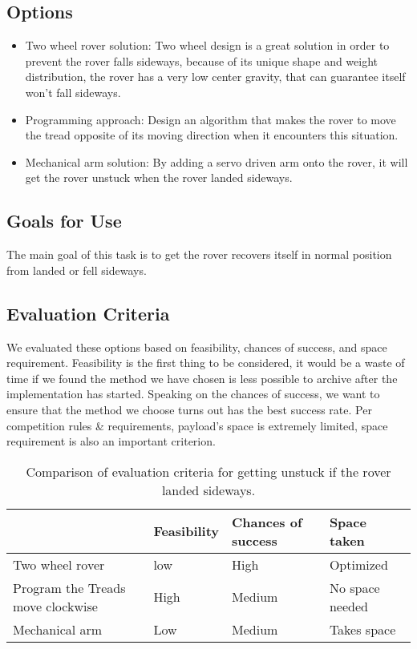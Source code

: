 \documentclass[10pt,letterpaper,onecolumn,journal]{IEEEtran}
\begin{document}
\subsection{Options}
\begin{itemize}
	\item Two wheel rover solution: Two wheel design is a great solution in order to prevent the rover falls sideways, because of its unique shape and weight distribution, the rover has a very low center gravity, that can guarantee itself won't fall sideways.  
	\item Programming approach: Design an algorithm that makes the rover to move the tread opposite of its moving direction when it encounters this situation.
	\item Mechanical arm solution: By adding a servo driven arm onto the rover, it will get the rover unstuck when the rover landed sideways. 
	
\end{itemize}
\subsection{Goals for Use}
The main goal of this task is to get the rover recovers itself in normal position from landed or fell sideways. 
\subsection{Evaluation Criteria}
We evaluated these options based on feasibility, chances of success, and space requirement. Feasibility is the first thing to be considered, it would be a waste of time if we found the method we have chosen is less possible to archive after the implementation has started. Speaking on the chances of success, we want to ensure that the method we choose turns out has the best success rate. Per competition rules \& requirements, payload's space is extremely limited, space requirement is also an important criterion. 

\begin{table}[h!]
	\centering
	\caption{Comparison of evaluation criteria for getting unstuck if the rover landed sideways.}
	\label{tab:table1}
	\begin{tabular}{l|l|l|l}
		& Feasibility & Chances of success    & Space taken \\
		\hline
		Two wheel rover        				 & low         &  High                & Optimized \\
		\hline
		Program the Treads move clockwise    & High        & Medium		          &  No space needed \\
		\hline
		Mechanical arm 						 & Low         & Medium	              &  Takes space  \\
	\end{tabular}
\end{table}
\end{document}
